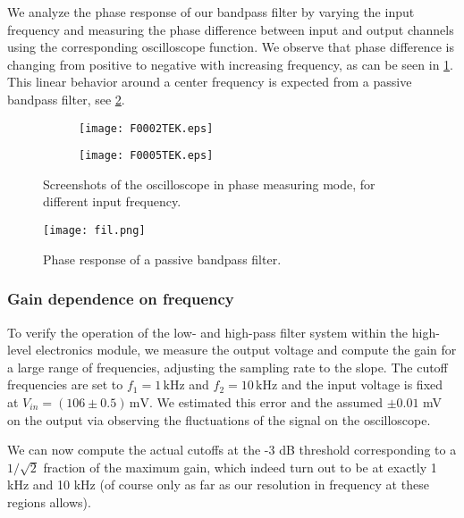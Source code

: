 We analyze the phase response of our bandpass filter by varying the input frequency and measuring the phase difference between input and output channels using the corresponding oscilloscope function. We observe that phase difference is changing from positive to negative with increasing frequency, as can be seen in \cref{fig:phase}. This linear behavior around a center frequency is expected from a passive bandpass filter, see \cref{fig:fil.png}.

\begin{figure}[H]
	\centering
	\begin{subfigure}{0.49\textwidth}
		\centering
		\texttt{[image: F0002TEK.eps]}
		\caption{}
	\end{subfigure}
	\begin{subfigure}{0.49\textwidth}
		\centering
		\texttt{[image: F0005TEK.eps]}
		\caption{}
	\end{subfigure}
	
	\caption{Screenshots of the oscilloscope in phase measuring mode, for different input frequency. }
	\label{fig:phase}
\end{figure}

\begin{figure}[H]
	\centering
	\texttt{[image: fil.png]}
	\caption{Phase response of a passive bandpass filter.\protect\footnotemark}
	\label{fig:fil.png}
\end{figure}

\subsubsection{Gain dependence on frequency}

To verify the operation of the low- and high-pass filter system within the high-level electronics module, we measure the output voltage and compute the gain for a large range of frequencies, adjusting the sampling rate to the slope. The cutoff frequencies are set to $f_1 = 1 \,\mathrm{kHz}$ and $f_2 = 10 \,\mathrm{kHz}$ and the input voltage is fixed at $V_{in} = (106 \pm 0.5) \,\mathrm{mV}$. We estimated this error and the assumed $\pm 0.01$ mV on the output via observing the fluctuations of the signal on the oscilloscope.

We can now compute the actual cutoffs at the -3 dB threshold corresponding to a $1/\sqrt{2}$ fraction of the maximum gain, which indeed turn out to be at exactly 1 kHz and 10 kHz (of course only as far as our resolution in frequency at these regions allows).

